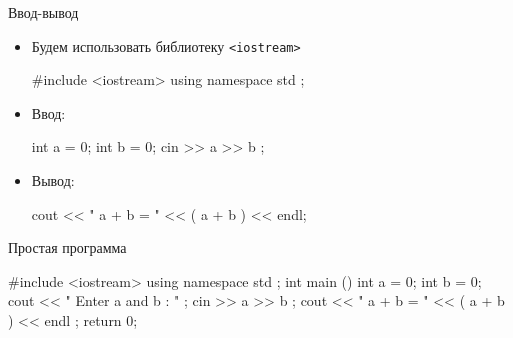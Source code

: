 \documentclass[
    9pt,
    hyperref={pdfencoding=unicode}
    ]{beamer}
\begin{document}
\begin{frame}[fragile]{Ввод-вывод}
    \begin{itemize}
        \item Будем использовать библиотеку \texttt{<iostream>}
        \begin{cppcode}
            #include <iostream>
            using namespace std ;

        \end{cppcode}
        \item Ввод:
        \begin{cppcode}
            int a = 0;
            int b = 0;
            cin >> a >> b ;
            
        \end{cppcode}
        \item Вывод:
        \begin{cppcode}
            cout << " a + b = " << ( a + b ) << endl;
        \end{cppcode}
    \end{itemize}
\end{frame}

\begin{frame}[fragile]{Простая программа}
    \begin{cppcode}
        #include <iostream>
        using namespace std ;
        int main ()
        {
            int a = 0;
            int b = 0;
            cout << " Enter a and b : " ;
            cin >> a >> b ;
            cout << " a + b = " << ( a + b ) << endl ;
            return 0;
        }
    \end{cppcode}
\end{frame}
\end{document}
